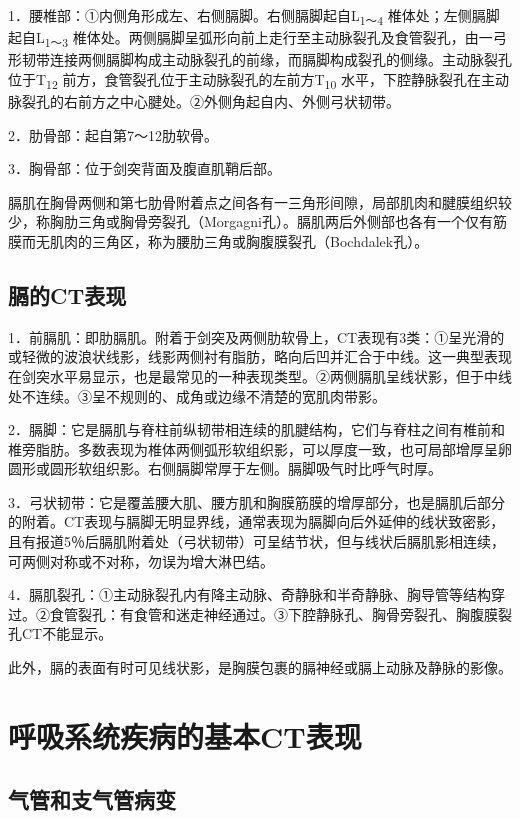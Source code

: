 1．腰椎部：①内侧角形成左、右侧膈脚。右侧膈脚起自L\textsubscript{1～4}
椎体处；左侧膈脚起自L\textsubscript{1～3}
椎体处。两侧膈脚呈弧形向前上走行至主动脉裂孔及食管裂孔，由一弓形韧带连接两侧膈脚构成主动脉裂孔的前缘，而膈脚构成裂孔的侧缘。主动脉裂孔位于T\textsubscript{12}
前方，食管裂孔位于主动脉裂孔的左前方T\textsubscript{10}
水平，下腔静脉裂孔在主动脉裂孔的右前方之中心腱处。②外侧角起自内、外侧弓状韧带。

2．肋骨部：起自第7～12肋软骨。

3．胸骨部：位于剑突背面及腹直肌鞘后部。

膈肌在胸骨两侧和第七肋骨附着点之间各有一三角形间隙，局部肌肉和腱膜组织较少，称胸肋三角或胸骨旁裂孔（Morgagni孔）。膈肌两后外侧部也各有一个仅有筋膜而无肌肉的三角区，称为腰肋三角或胸腹膜裂孔（Bochdalek孔）。

\subsection{膈的CT表现}

1．前膈肌：即肋膈肌。附着于剑突及两侧肋软骨上，CT表现有3类：①呈光滑的或轻微的波浪状线影，线影两侧衬有脂肪，略向后凹并汇合于中线。这一典型表现在剑突水平易显示，也是最常见的一种表现类型。②两侧膈肌呈线状影，但于中线处不连续。③呈不规则的、成角或边缘不清楚的宽肌肉带影。

2．膈脚：它是膈肌与脊柱前纵韧带相连续的肌腱结构，它们与脊柱之间有椎前和椎旁脂肪。多数表现为椎体两侧弧形软组织影，可以厚度一致，也可局部增厚呈卵圆形或圆形软组织影。右侧膈脚常厚于左侧。膈脚吸气时比呼气时厚。

3．弓状韧带：它是覆盖腰大肌、腰方肌和胸膜筋膜的增厚部分，也是膈肌后部分的附着。CT表现与膈脚无明显界线，通常表现为膈脚向后外延伸的线状致密影，且有报道5％后膈肌附着处（弓状韧带）可呈结节状，但与线状后膈肌影相连续，可两侧对称或不对称，勿误为增大淋巴结。

4．膈肌裂孔：①主动脉裂孔内有降主动脉、奇静脉和半奇静脉、胸导管等结构穿过。②食管裂孔：有食管和迷走神经通过。③下腔静脉孔、胸骨旁裂孔、胸腹膜裂孔CT不能显示。

此外，膈的表面有时可见线状影，是胸膜包裹的膈神经或膈上动脉及静脉的影像。

\section{呼吸系统疾病的基本CT表现}

\subsection{气管和支气管病变}

